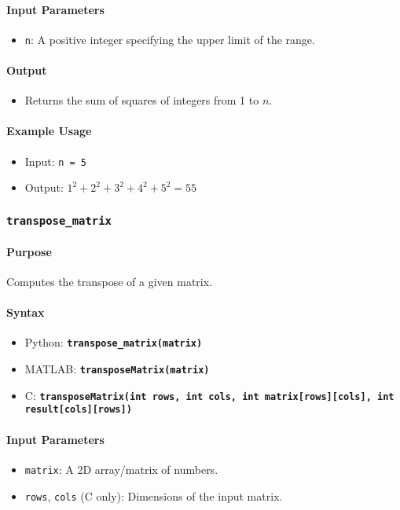 \documentclass[11pt, a4paper]{article}
\newcommand{\function}[1]{\texttt{\color{blue}\textbf{#1}}}
\begin{document}
	\paragraph*{Input Parameters}
	\begin{itemize}
		\item \texttt{n}: A positive integer specifying the upper limit of the range.
	\end{itemize}
	
	\paragraph*{Output}
	\begin{itemize}
		\item Returns the sum of squares of integers from 1 to $n$.
	\end{itemize}
	
	\paragraph*{Example Usage}
	\begin{itemize}
		\item Input: \texttt{n = 5}
		\item Output: $1^2 + 2^2 + 3^2 + 4^2 + 5^2 = 55$
	\end{itemize}
	
	\subsubsection*{\function{transpose\_matrix}}
	\paragraph*{Purpose}
	Computes the transpose of a given matrix.
	
	\paragraph*{Syntax}
	\begin{itemize}
		\item Python: \function{transpose\_matrix(matrix)}
		\item MATLAB: \function{transposeMatrix(matrix)}
		\item C: \function{transposeMatrix(int rows, int cols, int matrix[rows][cols], int result[cols][rows])}
	\end{itemize}
	
	\paragraph*{Input Parameters}
	\begin{itemize}
		\item \texttt{matrix}: A 2D array/matrix of numbers.
		\item \texttt{rows}, \texttt{cols} (C only): Dimensions of the input matrix.
	\end{itemize}
	
\end{document}
